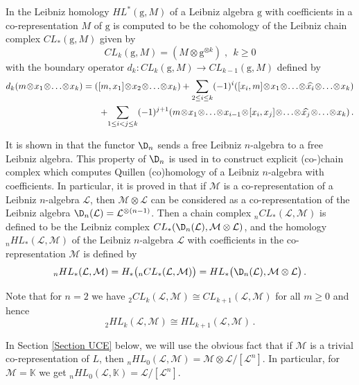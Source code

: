 \documentclass[12pt, reqno]{amsart}
\begin{document}
In \cite{LP} the Leibniz homology $HL^*(\textrm{g},M)$ of a Leibniz algebra $\textrm{g}$
with coefficients in a co-representation $M$ of $\textrm{g}$ is computed to be the cohomology of the Leibniz chain complex
$CL_*(\textrm{g},M)$ given by
\[
CL_k(\textrm{g},M)
 = (M\otimes \textrm{g}^{\otimes k})\;, \ \ k\geq 0
 \]
 with the boundary operator $d_k:CL_k(\textrm{g},M)\to
 CL_{k-1}(\textrm{g},M)$ defined by
 \begin{align*}
 d_k(m \!\otimes\! x_1 \!\otimes\! \dots \!\otimes\! x_k) = ([m,x_1]\!\otimes\!x_2\!\otimes\! \dots \!\otimes\! x_k)
 + \underset{\scriptsize{2\leq i \leq k}}\sum (-1)^i ([x_i, m]\!\otimes\! x_1\!\otimes\! \dots \!\otimes\! \widehat{x_i} \!\otimes\! \dots  \!\otimes\! x_k)\\
 + \underset{\scriptsize{1\leq i < j \leq k}}\sum (-1)^{j+1}(m\!\otimes\! x_1\!\otimes\! \dots \!\otimes\! x_{i-1}\!\otimes\! [x_i,x_j]\!\otimes\!\dots \!\otimes\! \widehat{x_j} \!\otimes\! \dots \!\otimes\! {x_k} )\, .
\end{align*}

 It is shown in \cite{CLP} that the functor $\D_n$ sends a free Leibniz $n$-algebra to a free Leibniz algebra. This property of $\D_n$ is used in \cite{Ca 2, CLP} to construct explicit (co-)chain complex which computes Quillen (co)homology of a Leibniz $n$-algebra with coefficients.
In particular,  it is proved in \cite[Proposition 3.1]{Ca 2} that if $\mathcal {M}$ is a co-representation of a Leibniz $n$-algebra $\mathcal{L}$, then $\mathcal{M}\otimes \mathcal{L}$  can be considered as a co-representation of the Leibniz algebra $\D_n(\mathcal{L})=\mathcal{L}^{\otimes (n-1)}$.
Then a chain complex $_nCL_*(\mathcal{L}, \mathcal{M})$ is defined to be the Leibniz complex $CL_*(\D_n(\mathcal{L}), \mathcal{\mathcal{M}\otimes \mathcal{L}})$,
  and the homology ${}_nHL_*(\mathcal{L},\mathcal {M})$ of the Leibniz $n$-algebra $\mathcal{L}$ with coefficients in the co-representation $\mathcal{M}$  is defined by
\[
{}_nHL_*(\mathcal{L},\mathcal {M})=H_*\big({}_nCL_*(\mathcal{L},\mathcal{M})\big)
=HL_*\big(\D_{n}(\mathcal{L}),\mathcal{M}\otimes \mathcal{L}\big)\,.
\]

Note that for $n=2$ we have ${}_2CL_k(\mathcal {L},\mathcal
{M})\cong CL_{k+1}(\mathcal {L},\mathcal {M})$ for all $m\geq 0$ and hence
\begin{equation}\label{eq3}
{}_2HL_k(\mathcal {L},\mathcal {M})\cong HL_{k+1}(\mathcal{L},\mathcal {M})\,.
\end{equation}

In Section \ref{Section UCE} below, we will use the obvious fact that if $\mathcal {M}$ is a trivial co-representation of $L$, then ${}_nHL_0(\mathcal{L},\mathcal {M}) = \mathcal {M}\otimes \mathcal {L}/[\mathcal {L}^n]$. In particular, for $ \mathcal {M} = \mathbb{K}$ we get  ${}_nHL_0(\mathcal{L},\mathbb{K}) = \mathcal {L}/[\mathcal {L}^n]$.
\end{document}

